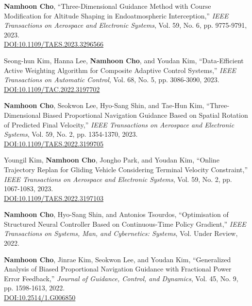 \begin{enumerate}[itemsep=0.5em, label={[}J\arabic*{]}]
\item \textbf{Namhoon Cho}, ``Three-Dimensional Guidance Method with Course Modification for Altitude Shaping in Endoatmospheric Interception,'' \textit{IEEE Transactions on Aerospace and Electronic Systems}, Vol. 59, No. 6, pp. 9775-9791, 2023. \\
\href{https://doi.org/10.1109/TAES.2023.3296566}{DOI:10.1109/TAES.2023.3296566}

\item Seong-hun Kim, Hanna Lee, \textbf{Namhoon Cho}, and Youdan Kim, ``Data-Efficient Active Weighting Algorithm for Composite Adaptive Control Systems,'' \textit{IEEE Transactions on Automatic Control}, Vol. 68, No. 5, pp. 3086-3090, 2023. \\
\href{https://doi.org/10.1109/TAC.2022.3197702}{DOI:10.1109/TAC.2022.3197702}

\item \textbf{Namhoon Cho}, Seokwon Lee, Hyo-Sang Shin, and Tae-Hun Kim, ``Three-Dimensional Biased Proportional Navigation Guidance Based on Spatial Rotation of Predicted Final Velocity,'' \textit{IEEE Transactions on Aerospace and Electronic Systems}, Vol. 59, No. 2, pp. 1354-1370, 2023. \\
\href{https://doi.org/10.1109/TAES.2022.3199705}{DOI:10.1109/TAES.2022.3199705}

\item Youngil Kim, \textbf{Namhoon Cho}, Jongho Park, and Youdan Kim, ``Online Trajectory Replan for Gliding Vehicle Considering Terminal Velocity Constraint,'' \textit{IEEE Transactions on Aerospace and Electronic Systems}, Vol. 59, No. 2, pp. 1067-1083, 2023. \\
\href{https://doi.org/10.1109/TAES.2022.3197103}{DOI:10.1109/TAES.2022.3197103}

\item \textbf{Namhoon Cho}, Hyo-Sang Shin, and Antonios Tsourdos, ``Optimisation of Structured Neural Controller Based on Continuous-Time Policy Gradient,'' \textit{IEEE Transactions on Systems, Man, and Cybernetics: Systems}, Vol. Under Review, 2022. 

\item \textbf{Namhoon Cho}, Jinrae Kim, Seokwon Lee, and Youdan Kim, ``Generalized Analysis of Biased Proportional Navigation Guidance with Fractional Power Error Feedback,'' \textit{Journal of Guidance, Control, and Dynamics}, Vol. 45, No. 9, pp. 1598-1613, 2022. \\
\href{https://doi.org/10.2514/1.G006850}{DOI:10.2514/1.G006850}


\end{enumerate}
